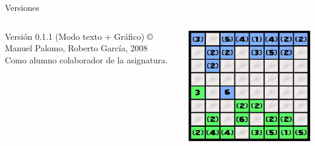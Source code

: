 \documentclass[smaller,spanish,xcolor=svgnames]{beamer}
\begin{document}
\begin{frame}{Versiones}
  \begin{columns}
    \begin{block}{Versión 0.1.1 (Modo texto + Gráfico)}
      \copyright \, Manuel Palomo, Roberto García, 2008\\
      Como alumno colaborador de la asignatura.
    \end{block}
    \includegraphics[width=\textwidth]{img/version_2}
  \end{columns}  
\end{frame}
\end{document}
